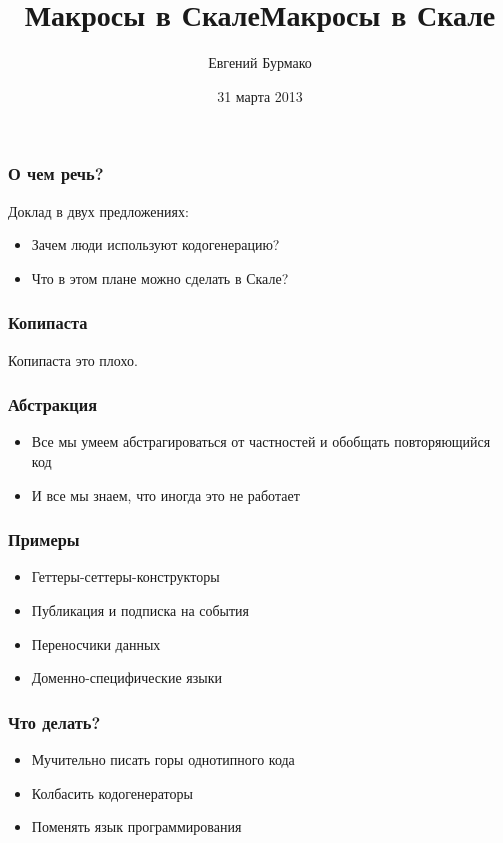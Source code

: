 \documentclass[svgnames,hyperref={bookmarks=false}]{beamer}
\title{Макросы в Скале}
\begin{document}
\title{Макросы в Скале}
\author{Евгений Бурмако}
\date{31 марта 2013}
{
\begin{frame}
  \titlepage
\end{frame}
}

\begin{frame}[fragile]
\frametitle{О чем речь?}

Доклад в двух предложениях:
\begin{itemize}
\item Зачем люди используют кодогенерацию?
\item Что в этом плане можно сделать в Скале?
\end{itemize}
\end{frame}

\begin{frame}[fragile]
\frametitle{Копипаста}

Копипаста это плохо.
\end{frame}

\begin{frame}[fragile]
\frametitle{Абстракция}

\begin{itemize}
\item Все мы умеем абстрагироваться от частностей и обобщать повторяющийся код
\item И все мы знаем, что иногда это не работает
\end{itemize}
\end{frame}

\begin{frame}[fragile]
\frametitle{Примеры}

\begin{itemize}
\item Геттеры-сеттеры-конструкторы
\item Публикация и подписка на события
\item Переносчики данных
\item Доменно-специфические языки
\end{itemize}
\end{frame}

\begin{frame}[fragile]
\frametitle{Что делать?}

\begin{itemize}
\item Мучительно писать горы однотипного кода
\item Колбасить кодогенераторы
\item Поменять язык программирования
\end{itemize}
\end{frame}
\end{document}
